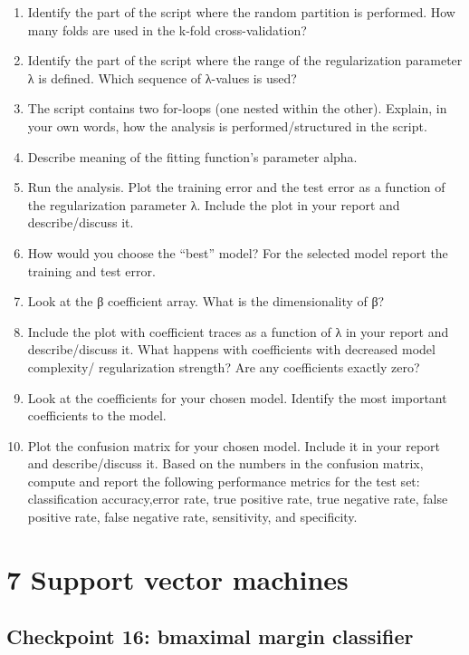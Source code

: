 \documentclass[
  letterpaper,
  DIV=11,
  numbers=noendperiod]{scrartcl}
\begin{document}
\begin{enumerate}
\def\labelenumi{(\alph{enumi})}
\setcounter{enumi}{1}
\item
  Identify the part of the script where the random partition is
  performed. How many folds are used in the k-fold cross-validation?
\item
  Identify the part of the script where the range of the regularization
  parameter λ is defined. Which sequence of λ-values is used?
\item
  The script contains two for-loops (one nested within the other).
  Explain, in your own words, how the analysis is performed/structured
  in the script.
\item
  Describe meaning of the fitting function's parameter alpha.
\item
  Run the analysis. Plot the training error and the test error as a
  function of the regularization parameter λ. Include the plot in your
  report and describe/discuss it.
\item
  How would you choose the ``best'' model? For the selected model report
  the training and test error.
\item
  Look at the β coefficient array. What is the dimensionality of β?
\item
  Include the plot with coefficient traces as a function of λ in your
  report and describe/discuss it. What happens with coefficients with
  decreased model complexity/ regularization strength? Are any
  coefficients exactly zero?
\item
  Look at the coefficients for your chosen model. Identify the most
  important coefficients to the model.
\item
  Plot the confusion matrix for your chosen model. Include it in your
  report and describe/discuss it. Based on the numbers in the confusion
  matrix, compute and report the following performance metrics for the
  test set: classification accuracy,error rate, true positive rate, true
  negative rate, false positive rate, false negative rate, sensitivity,
  and specificity.
\end{enumerate}

\hypertarget{support-vector-machines}{%
\section{7 Support vector machines}\label{support-vector-machines}}

\hypertarget{checkpoint-16-bmaximal-margin-classifier}{%
\subsection{Checkpoint 16: bmaximal margin
classifier}\label{checkpoint-16-bmaximal-margin-classifier}}
\end{document}
